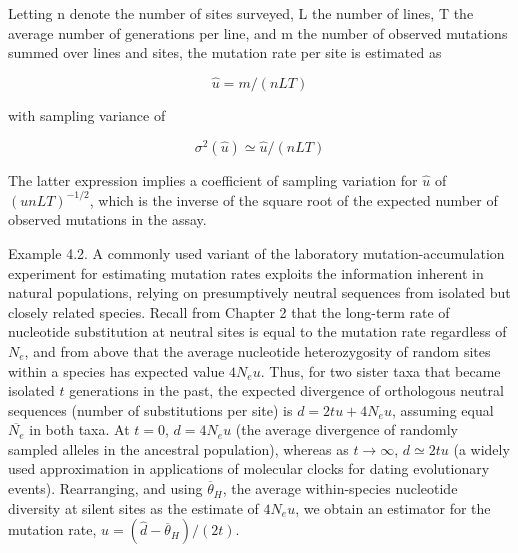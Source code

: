 \documentclass{article}
\begin{document}
Letting n denote the number of sites surveyed, L the number of lines, T the average number of generations per line, and m the number of observed mutations summed over lines and sites, the mutation rate per site is estimated as

\begin{equation}
\widehat{u}=m/(n L T)
\tag{4.20a}
\label{eq:4_20a}
\end{equation}

with sampling variance of

\begin{equation}
\sigma^{2}(\widehat{u})\simeq\widehat{u}/(n L T)
\tag{4.20b}
\label{eq:4_20b}
\end{equation}

The latter expression implies a coefficient of sampling variation for  $ \widehat{u} $ of  $ (unLT)^{-1/2} $, which is the inverse of the square root of the expected number of observed mutations in the assay.

Example 4.2. A commonly used variant of the laboratory mutation-accumulation experiment for estimating mutation rates exploits the information inherent in natural populations, relying on presumptively neutral sequences from isolated but closely related species. Recall from Chapter 2 that the long-term rate of nucleotide substitution at neutral sites is equal to the mutation rate regardless of  $ N_e $, and from above that the average nucleotide heterozygosity of random sites within a species has expected value  $ 4N_e u $. Thus, for two sister taxa that became isolated  $ t $ generations in the past, the expected divergence of orthologous neutral sequences (number of substitutions per site) is  $ d = 2tu + 4N_e u $, assuming equal  $ \overline{N_e} $ in both taxa. At  $ t = 0 $,  $ d = 4N_e u $ (the average divergence of randomly sampled alleles in the ancestral population), whereas as  $ t \to \infty $,  $ d \simeq 2tu $ (a widely used approximation in applications of molecular clocks for dating evolutionary events). Rearranging, and using  $ \overline{\theta}_H $, the average within-species nucleotide diversity at silent sites as the estimate of  $ 4N_e u $, we obtain an estimator for the mutation rate,  $ \widehat{u} = (\widehat{d} - \overline{\theta}_H)/(2t) $.
\end{document}

